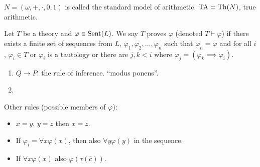 \documentclass{report}
\begin{document}

$N = (\omega, +, \cdot, 0, 1)$ is called the standard model of arithmetic. $\text{TA} = \text{Th}(N)$, true arithmetic. 


Let $T$ be a theory and $\varphi \in \text{Sent}(L)$. We say $T$ proves $\varphi$ (denoted $T \vdash \varphi$) if there exists a finite set of sequences from $L$, $\varphi_1, \varphi_2, \ldots, \varphi_n$ such that $\varphi_n = \varphi$ and for all $i$, $\varphi_i \in T$ or $\varphi_i$ is a tautology or there are $j, k < i$ where $\varphi_j = (\varphi_k \implies \varphi_i)$.

\begin{enumerate}
    \item $Q \to P$: the rule of inference. ``modus ponens''.
    \item 
\end{enumerate}
Other rules (possible members of $\varphi$):
\begin{itemize}
    \item $x = y$, $y  = z$ then $x = z$.
    \item If $\varphi_i = \forall x \varphi(x)$, then also $\forall y \varphi(y)$ in the sequence. 
    \item If $\forall x \varphi (x)$ also $\varphi(\tau(\bar c))$. 
\end{itemize}

\end{document}
